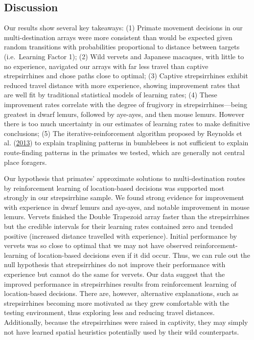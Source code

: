 \documentclass[twoside,12pt,final]{ucthesis-CA2012}
\begin{document}
\begin{ucmainmatter}
\hypertarget{discussion}{%
\section{Discussion}\label{discussion}}

Our results show several key takeaways: (1) Primate movement decisions in our multi-destination arrays were more consistent than would be expected given random transitions with probabilities proportional to distance between targets (i.e.~Learning Factor 1); (2) Wild vervets and Japanese macaques, with little to no experience, navigated our arrays with far less travel than captive strepsirrhines and chose paths close to optimal; (3) Captive strepsirrhines exhibit reduced travel distance with more experience, showing improvement rates that are well fit by traditional statistical models of learning rates; (4) These improvement rates correlate with the degree of frugivory in strepsirrhines---being greatest in dwarf lemurs, followed by aye-ayes, and then mouse lemurs. However there is too much uncertainty in our estimates of learning rates to make definitive conclusions; (5) The iterative-reinforcement algorithm proposed by Reynolds et al. (\protect\hyperlink{ref-reynolds2013}{2013}) to explain traplining patterns in bumblebees is not sufficient to explain route-finding patterns in the primates we tested, which are generally not central place foragers.

Our hypothesis that primates' approximate solutions to multi-destination routes by reinforcement learning of location-based decisions was supported most strongly in our strepsirrhine sample. We found strong evidence for improvement with experience in dwarf lemurs and aye-ayes, and notable improvement in mouse lemurs. Vervets finished the Double Trapezoid array faster than the strepsirrhines but the credible intervals for their learning rates contained zero and trended positive (increased distance travelled with experience). Initial performance by vervets was so close to optimal that we may not have observed reinforcement-learning of location-based decisions even if it did occur. Thus, we can rule out the null hypothesis that strepsirrhines do not improve their performance with experience but cannot do the same for vervets. Our data suggest that the improved performance in strepsirrhines results from reinforcement learning of location-based decisions. There are, however, alternative explanations, such as strepsirrhines becoming more motivated as they grew comfortable with the testing environment, thus exploring less and reducing travel distances. Additionally, because the strepsirrhines were raised in captivity, they may simply not have learned spatial heuristics potentially used by their wild counterparts.


\end{ucmainmatter}
\end{document}
